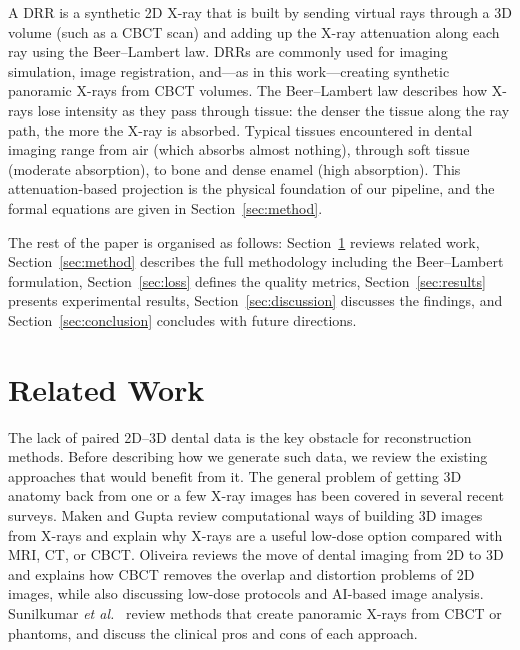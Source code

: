 \documentclass[conference]{IEEEtran}
\begin{document}
A DRR is a synthetic 2D X-ray that is built by sending virtual rays through a 3D volume (such as a CBCT scan) and adding up the X-ray attenuation along each ray using the Beer--Lambert law. DRRs are commonly used for imaging simulation, image registration, and---as in this work---creating synthetic panoramic X-rays from CBCT volumes. The Beer--Lambert law describes how X-rays lose intensity as they pass through tissue: the denser the tissue along the ray path, the more the X-ray is absorbed. Typical tissues encountered in dental imaging range from air (which absorbs almost nothing), through soft tissue (moderate absorption), to bone and dense enamel (high absorption). This attenuation-based projection is the physical foundation of our pipeline, and the formal equations are given in Section~\ref{sec:method}.

The rest of the paper is organised as follows: Section~\ref{sec:related} reviews related work, Section~\ref{sec:method} describes the full methodology including the Beer--Lambert formulation, Section~\ref{sec:loss} defines the quality metrics, Section~\ref{sec:results} presents experimental results, Section~\ref{sec:discussion} discusses the findings, and Section~\ref{sec:conclusion} concludes with future directions.

\section{Related Work}
\label{sec:related}

The lack of paired 2D--3D dental data is the key obstacle for reconstruction methods. Before describing how we generate such data, we review the existing approaches that would benefit from it. The general problem of getting 3D anatomy back from one or a few X-ray images has been covered in several recent surveys. Maken and Gupta \cite{maken20232d} review computational ways of building 3D images from X-rays and explain why X-rays are a useful low-dose option compared with MRI, CT, or CBCT. Oliveira \cite{oliveira2025digital} reviews the move of dental imaging from 2D to 3D and explains how CBCT removes the overlap and distortion problems of 2D images, while also discussing low-dose protocols and AI-based image analysis. Sunilkumar \emph{et al.}\ \cite{sunilkumar2024recent} review methods that create panoramic X-rays from CBCT or phantoms, and discuss the clinical pros and cons of each approach.
\end{document}
